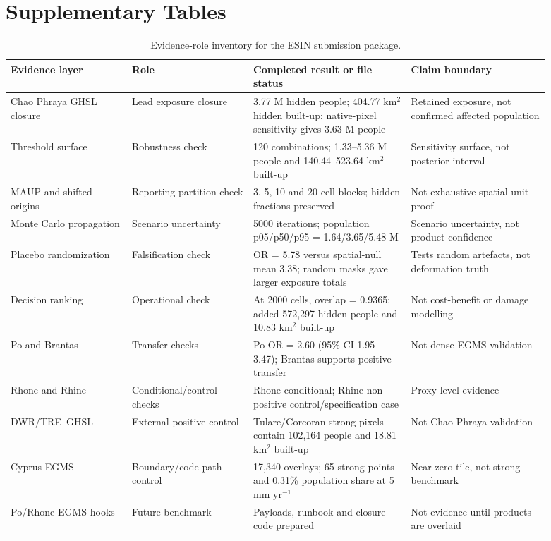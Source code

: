 \documentclass[11pt]{article}
\begin{document}
\section*{Supplementary Tables}

\begin{table}[htbp]
\centering
\caption{Evidence-role inventory for the ESIN submission package.}
\label{tab:S1}
\scriptsize
\setlength{\tabcolsep}{3pt}
\renewcommand{\arraystretch}{0.92}
\begin{tabular}{p{0.20\linewidth}p{0.20\linewidth}p{0.26\linewidth}p{0.23\linewidth}}
\toprule
Evidence layer & Role & Completed result or file status & Claim boundary \\
\midrule
Chao Phraya GHSL closure & Lead exposure closure & 3.77 M hidden people; 404.77 km$^2$ hidden built-up; native-pixel sensitivity gives 3.63 M people & Retained exposure, not confirmed affected population \\
Threshold surface & Robustness check & 120 combinations; 1.33--5.36 M people and 140.44--523.64 km$^2$ built-up & Sensitivity surface, not posterior interval \\
MAUP and shifted origins & Reporting-partition check & 3, 5, 10 and 20 cell blocks; hidden fractions preserved & Not exhaustive spatial-unit proof \\
Monte Carlo propagation & Scenario uncertainty & 5000 iterations; population p05/p50/p95 = 1.64/3.65/5.48 M & Scenario uncertainty, not product confidence \\
Placebo randomization & Falsification check & OR = 5.78 versus spatial-null mean 3.38; random masks gave larger exposure totals & Tests random artefacts, not deformation truth \\
Decision ranking & Operational check & At 2000 cells, overlap = 0.9365; added 572,297 hidden people and 10.83 km$^2$ built-up & Not cost-benefit or damage modelling \\
Po and Brantas & Transfer checks & Po OR = 2.60 (95\% CI 1.95--3.47); Brantas supports positive transfer & Not dense EGMS validation \\
Rhone and Rhine & Conditional/control checks & Rhone conditional; Rhine non-positive control/specification case & Proxy-level evidence \\
DWR/TRE--GHSL & External positive control & Tulare/Corcoran strong pixels contain 102,164 people and 18.81 km$^2$ built-up & Not Chao Phraya validation \\
Cyprus EGMS & Boundary/code-path control & 17,340 overlays; 65 strong points and 0.31\% population share at 5 mm yr$^{-1}$ & Near-zero tile, not strong benchmark \\
Po/Rhone EGMS hooks & Future benchmark & Payloads, runbook and closure code prepared & Not evidence until products are overlaid \\
\bottomrule
\end{tabular}
\end{table}
\end{document}
